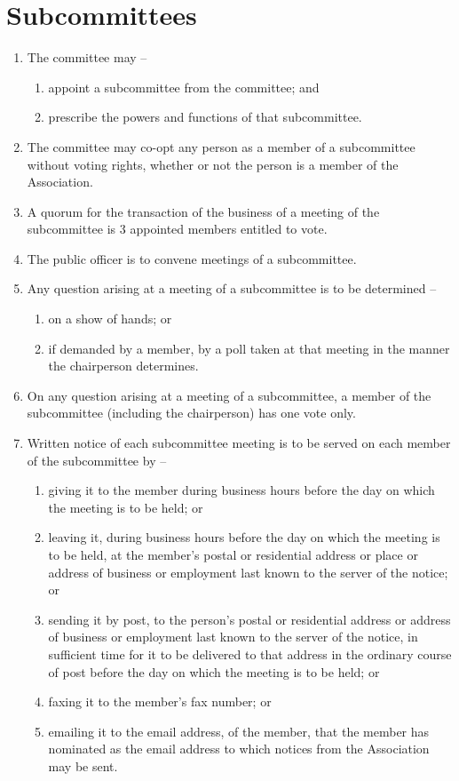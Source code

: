 \section{Subcommittees}
\label{rule:subcommittee}

\begin{enumerate}
	\item The committee may --
	\begin{enumerate}
		\item appoint a subcommittee from the committee; and
		\item prescribe the powers and functions of that subcommittee.
	\end{enumerate}
	
	\item The committee may co-opt any person as a member of a subcommittee without voting rights, whether or not the person is a member of the Association.
	\item A quorum for the transaction of the business of a meeting of the subcommittee is 3 appointed members entitled to vote.
	\item The public officer is to convene meetings of a subcommittee.
	
	\item Any question arising at a meeting of a subcommittee is to be determined --
	\begin{enumerate}
		\item on a show of hands; or
		\item if demanded by a member, by a poll taken at that meeting in the manner the chairperson determines.
	\end{enumerate}
	
	\item On any question arising at a meeting of a subcommittee, a member of the subcommittee (including the chairperson) has one vote only.
	
	\item Written notice of each subcommittee meeting is to be served on each member of the subcommittee by --
	\begin{enumerate}
		\item giving it to the member during business hours before the day on which the meeting is to be held; or
		\item leaving it, during business hours before the day on which the meeting is to be held, at the member's postal or residential address or place or address of business or employment last known to the server of the notice; or
		\item sending it by post, to the person's postal or residential address or address of business or employment last known to the server of the notice, in sufficient time for it to be delivered to that address in the ordinary course of post before the day on which the meeting is to be held; or
		\item faxing it to the member's fax number; or
		\item emailing it to the email address, of the member, that the member has nominated as the email address to which notices from the Association may be sent.
	\end{enumerate}
\end{enumerate}